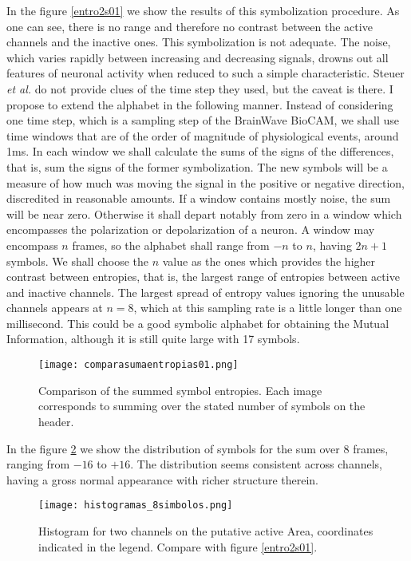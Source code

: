\documentclass[10pt]{article}
\begin{document}
In the figure \ref{entro2s01} we show the results of this symbolization procedure.
As one can see, there is no range and therefore no contrast between the
active channels and the inactive ones. This symbolization is not adequate. The
noise, which varies rapidly between increasing and decreasing signals, drowns
out all features of neuronal activity when reduced to such a simple characteristic.
Steuer \emph{et al.} do not provide clues of the time step they used, but the caveat
is there. I propose to extend the alphabet in the following manner.
Instead of considering one time step, which is a sampling step of the BrainWave
BioCAM, we shall use time windows that are of the order of magnitude of physiological
events, around 1ms. In each window we shall calculate the sums of the signs
of the differences, that is, sum the signs of the former symbolization. The new symbols
will be a measure of how much was moving the signal in the positive or negative
direction, discredited in reasonable amounts. If a window contains mostly noise,
the sum will be near zero. Otherwise it shall depart notably from zero
in a window which encompasses the polarization or depolarization of a neuron. A window
may encompass $n$ frames, so the alphabet shall range from $-n$ to $n$, having
$2n+1$ symbols. We shall choose the $n$ value as the ones which provides the
higher contrast between entropies, that is, the largest range of entropies between
active and inactive channels. The largest spread of entropy values ignoring the
unusable channels appears at $n=8$, which at this sampling rate is a little longer
than one millisecond. This could be a good symbolic alphabet for obtaining the
Mutual Information, although it is still quite large with 17 symbols. 
\begin{figure}
  \begin{center}
    \texttt{[image: comparasumaentropias01.png]}
    \end{center}
  \caption{Comparison of the summed symbol entropies. Each image corresponds
    to summing over the stated number of symbols on the header.}
  \label{compsumentro}
\end{figure}

In the figure  \ref{h8sim} we
show the distribution of symbols for the sum over 8 frames, ranging from
$-16$ to $+16$. The distribution seems consistent across channels, having a
gross normal appearance with richer structure therein.

\begin{figure}
  \centering
  \texttt{[image: histogramas\_8simbolos.png]}
  \caption{Histogram for two channels on the putative active Area, coordinates indicated in the legend. Compare with figure \ref{entro2s01}.}
  \label{h8sim}
\end{figure}
\end{document}
